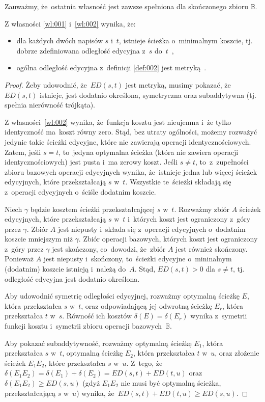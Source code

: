 \documentclass{praca1}
\begin{document}
Zauważmy, że~ostatnia własność jest zawsze spełniona dla skończonego zbioru $\mathbb{B}$.

\begin{theorem}
Z własności \ref{wl:001} i~\ref{wl:002} wynika, że:
\begin{itemize}
\item dla każdych dwóch napisów $s$ i~$t$, istnieje ścieżka o~minimalnym koszcie, tj. dobrze zdefiniowana odległość edycyjna z~$s$ do~$t$~\cite{Boytsov2011:indexingmethods},
\item ogólna odległość edycyjna z~definicji \ref{def:002} jest metryką~\cite{Wagner1974:stringtostring}.
\end{itemize}
\end{theorem}

\begin{proof}
Żeby udowodnić, że~$ED(s,t)$ jest metryką, musimy pokazać, że~$ED(s,t)$ istnieje, 	jest dodatnio określona, symetryczna oraz subaddytywna (tj. spełnia nierówność trójkąta).

Z własności~\ref{wl:002} wynika, że~funkcja kosztu jest nieujemna i~że tylko identyczność ma~koszt równy zero. Stąd, bez utraty ogólności, możemy rozważyć jedynie takie ścieżki edycyjne, które nie zawierają operacji identycznościowych. Zatem, jeśli $s=t$, to~jedyna optymalna ścieżka (która nie zawiera operacji identycznościowych) jest pusta i~ma zerowy koszt. Jeśli $s\neq t$, to~z~zupełności zbioru bazowych operacji edycyjnych wynika, że~istnieje jedna lub więcej ścieżek edycyjnych, które przekształcają $s$ w~$t$. Wszystkie te~ścieżki składają się z~operacji edycyjnych o~ściśle dodatnim koszcie.

Niech $\gamma$ będzie kosztem ścieżki przekształcającej $s$ w~$t$. Rozważmy zbiór $A$ ścieżek edycyjnych, które przekształcają $s$ w~$t$ i~których koszt jest ograniczony z~góry przez $\gamma$. Zbiór $A$ jest niepusty i~składa się z~operacji edycyjnych o~dodatnim koszcie mniejszym niż $\gamma$. Zbiór operacji bazowych, których koszt jest ograniczony z~góry przez $\gamma$ jest skończony, co~dowodzi, że~zbiór $A$ jest również skończony. Ponieważ $A$ jest niepusty i~skończony, to~ścieżki edycyjne o~mininalnym (dodatnim) koszcie istnieją i~należą do~$A$. Stąd, $ED(s,t) > 0$ dla $s\neq t$, tj. odległość edycyjna jest dodatnio określona.

Aby udowodnić symetrię odległości edycyjnej, rozważmy optymalną ścieżkę $E$, która przekształca $s$ w~$t$, oraz odpowiadającą jej odwrotną ścieżkę $E_r$, która przekształca $t$ w~$s$. Równość ich kosztów $\delta(E) = \delta(E_r)$ wynika z~symetrii funkcji kosztu i~symetrii zbioru operacji bazowych~$\mathbb{B}$. 

Aby pokazać subaddytywność, rozważmy optymalną ścieżkę $E_1$, która przekształca $s$ w~$t$, optymalną ścieżkę $E_2$, która przekształca $t$ w~$u$, oraz złożenie ścieżek $E_1E_2$, które przekształca $s$ w~$u$. Z~tego, że~$\delta(E_1E_2) = \delta(E_1) + \delta(E_2) = ED(s,t)+ED(t,u)$ oraz $\delta(E_1E_2) \geq ED(s,u)$ (gdyż $E_1 E_2$ nie musi być optymalną ścieżka, przekształcającą $s$ w~$u$) wynika, że~$ED(s,t)+ED(t,u) \geq ED(s,u)$.
\end{proof}
\end{document}
